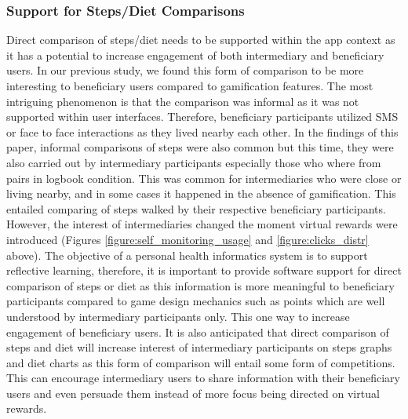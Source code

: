 \documentclass{sig-alternate}
\begin{document}
\subsubsection*{\textbf{Support for Steps/Diet Comparisons}}
Direct comparison of steps/diet needs to be supported within the app context as it has a potential to increase engagement of both intermediary and beneficiary users. In our previous study, we found this form of comparison to be more interesting to beneficiary users compared to gamification features. The most intriguing phenomenon is that the comparison was informal as it was not supported within user interfaces. Therefore, beneficiary participants utilized SMS or face to face interactions as they lived nearby each other.\newline
In the findings of this paper, informal comparisons of steps were also common but this time, they were also carried out by intermediary participants especially those who where from pairs in logbook condition. This was common for intermediaries who were close or living nearby, and in some cases it happened in the absence of gamification. This entailed comparing of steps walked by their respective beneficiary participants. However, the interest of intermediaries changed the moment virtual rewards were introduced (Figures \ref{figure:self_monitoring_usage} and \ref{figure:clicks_distr} above). The objective of a personal health informatics system is to support reflective learning, therefore, it is important to provide software support for direct comparison of steps or diet as this information is more meaningful to beneficiary participants compared to game design mechanics such as points which are well understood by intermediary participants only. This one way to increase engagement of beneficiary users. It is also anticipated that direct comparison of steps and diet will increase interest of intermediary participants on steps graphs and diet charts as this form of comparison will entail some form of competitions. This can encourage intermediary users to share information with their beneficiary users and even persuade them instead of more focus being directed on virtual rewards.
\end{document}
